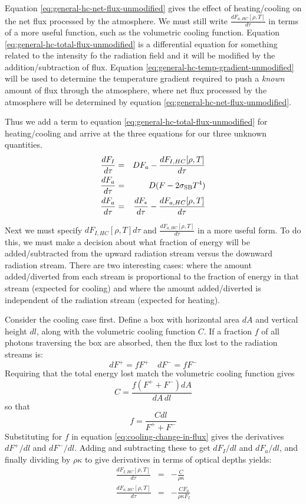 \documentclass{emulateapj}
\newcommand{\fsum}{F_I}
\newcommand{\fshc}{F_{I,HC}}
\newcommand{\sigmasb}{\sigma_{\rm SB}}
\begin{document}
Equation \ref{eq:general-hc-net-flux-unmodified} gives the effect of
heating/cooling on the net flux processed by the atmosphere.  We must
still write $\frac{dF_{a,HC}[\rho, T]}{d\tau}$ in terms of a more useful
function, such as the volumetric cooling function.  Equation
\ref{eq:general-hc-total-flux-unmodified} is a differential equation for
something related to the intensity fo the radiation field and it will
be modified by the addition/subtraction of flux.  Equation
\ref{eq:general-hc-temp-gradient-unmodified} will be used to determine
the temperature gradient required to push a {\em known} amount of flux
through the atmosphere, where net flux processed by the atmosphere
will be determined by equation \ref{eq:general-hc-net-flux-unmodified}.  

Thus we add a term to equation \ref{eq:general-hc-total-flux-unmodified}
for heating/cooling and arrive at the three equations for our three
unknown quantities.  
\begin{eqnarray}
\frac{d\fsum}{d\tau} &=& D F_a - \frac{d\fshc[\rho, T]}{d\tau} \\
\frac{dF_a}{d\tau} &=& D(F - 2\sigmasb T^4) \\
\frac{dF_a}{d\tau} &=& \frac{dF_*}{d\tau} 
  - \frac{dF_{a,HC}[\rho, T]}{d\tau} 
\end{eqnarray}

Next we must specify $d\fshc[\rho, T]d\tau$ and
$\frac{dF_{a,HC}[\rho, T]}{d\tau}$ in a more useful form.  To do this,
we must make a decision about what fraction of energy will be
added/subtracted from the upward radiation stream versus the downward
radiation stream.  There are two interesting cases: where the amount
added/diverted from each stream is proportional to the fraction of
energy in that stream (expected for cooling) and where the amount
added/diverted is independent of the radiation stream (expected for
heating).  

Consider the cooling case first.  Define a box with horizontal area
$dA$ and vertical height $dl$, along with the volumetric cooling
function $C$.  If a fraction $f$ of all photons traversing the box are
absorbed, then the flux lost to the radiation streams is:
\begin{equation}
  dF^+ = f F^+ \quad dF^- = f F^- 
  \label{eq:cooling-change-in-flux}
\end{equation}
Requiring that the total energy lost match the volumetric cooling
function gives
\begin{equation}
C = \frac{f (F^+ + F^-) dA}{dA \, dl}
\end{equation}
so that 
\begin{equation}
f =  \frac{C dl}{F^+ + F^-}
\end{equation}
Substituting for $f$ in equation \ref{eq:cooling-change-in-flux} gives
the derivatives $dF^+/dl$ and $dF^-/dl$.  Adding and subtracting these
to get $d\fsum/dl$ and $dF_a/dl$, and finally dividing by $\rho \kappa$
to give derivatives in terms of optical depths yields:
\begin{eqnarray}
  \frac{d\fshc[\rho, T]}{d\tau}
  &=& -\frac{C}{\rho \kappa} \\
  \frac{dF_{a,HC}[\rho, T]}{d\tau}
  &=& -\frac{C F_a}{\rho \kappa \fsum}
\end{eqnarray}
\end{document}
